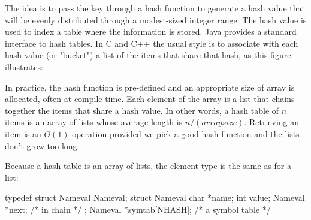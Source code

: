 The idea is to pass the key through a hash function to generate a hash
value that will be evenly distributed through a modest-sized integer range.
The hash value is used to index a table where the information is stored.
Java provides a standard interface to hash tables. In C and C++ the usual
style is to associate with each hash value (or "bucket") a list of the
items that share that hash, as this figure illustrates:
\begin{center}
\end{center}
In practice, the hash function is pre-defined and an appropriate size of
array is allocated, often at compile time. Each element of the array is a
list that chains together the items that share a hash value. In other
words, a hash table of $n$ items is an array of lists whose average length
is $n/(array size)$. Retrieving an item is an $O(1)$ operation provided we
pick a good hash function and the lists don't grow too long.

Because a hash table is an array of lists, the element type is the same as
for a list:
\begin{wellcode}
    typedef struct Nameval Nameval;
    struct Nameval {
        char *name;
        int value;
        Nameval *next;      /* in chain */
    };
    Nameval *symtab[NHASH]; /* a symbol table */
\end{wellcode}

